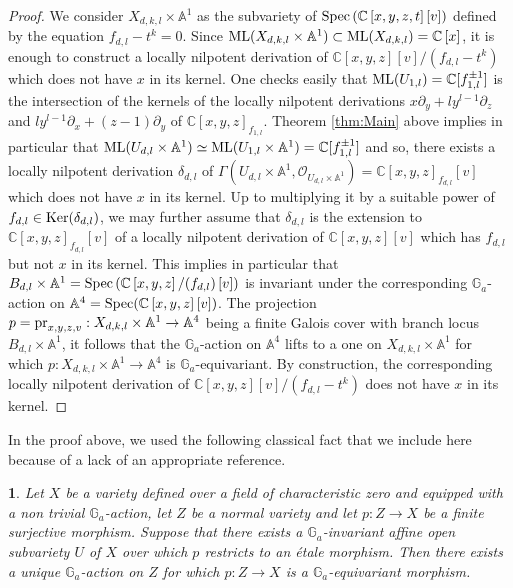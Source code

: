 \documentclass[10pt,oneside,english]{amsart}
\numberwithin{equation}{section}
\numberwithin{figure}{section}
\theoremstyle{plain}
\theoremstyle{remark}
\theoremstyle{plain}
\theoremstyle{plain}
\newtheorem{lem}[thm]{\protect\lemmaname}
\theoremstyle{definition}
\providecommand{\lemmaname}{Lemma}
\begin{document}
\begin{proof}
We consider $X_{d,k,l}\times\mathbb{A}^{1}$ as the subvariety of
${\rm Spec}\left(\mathbb{C}\left[x,y,z,t\right]\left[v\right]\right)$
defined by the equation $f_{d,l}-t^{k}=0$. Since ${\rm ML}(X_{d,k,l}\times\mathbb{A}^{1})\subset{\rm ML}(X_{d,k,l})=\mathbb{C}\left[x\right]$,
it is enough to construct a locally nilpotent derivation of $\mathbb{C}\left[x,y,z\right]\left[v\right]/(f_{d,l}-t^{k})$
which does not have $x$ in its kernel. One checks easily that ${\rm ML}(U_{1,l})=\mathbb{C}[f_{1,l}^{\pm1}]$
is the intersection of the kernels of the locally nilpotent derivations
$x\partial_{y}+ly^{l-1}\partial_{z}$ and $ly^{l-1}\partial_{x}+\left(z-1\right)\partial_{y}$
of $\mathbb{C}\left[x,y,z\right]_{f_{1,l}}$. Theorem \ref{thm:Main}
above implies in particular that ${\rm ML}(U_{d,l}\times\mathbb{A}^{1})\simeq{\rm ML}(U_{1,l}\times\mathbb{A}^{1})=\mathbb{C}[f_{1,l}^{\pm1}]$
and so, there exists a locally nilpotent derivation $\delta_{d,l}$
of $\Gamma(U_{d,l}\times\mathbb{A}^{1},\mathcal{O}_{U_{d,l}\times\mathbb{A}^{1}})=\mathbb{C}\left[x,y,z\right]_{f_{d,l}}\left[v\right]$
which does not have $x$ in its kernel. Up to multiplying it by a
suitable power of $f_{d,l}\in{\rm Ker}(\delta_{d,l})$, we may further
assume that $\delta_{d,l}$ is the extension to $\mathbb{C}\left[x,y,z\right]_{f_{d,l}}\left[v\right]$
of a locally nilpotent derivation of $\mathbb{C}\left[x,y,z\right]\left[v\right]$
which has $f_{d,l}$ but not $x$ in its kernel. This implies in particular
that $B_{d,l}\times\mathbb{A}^{1}={\rm Spec}\left(\mathbb{C}\left[x,y,z\right]/(f_{d,l})\left[v\right]\right)$
is invariant under the corresponding $\mathbb{G}_{a}$-action on $\mathbb{A}^{4}={\rm Spec}(\mathbb{C}\left[x,y,z\right]\left[v\right])$.
The projection $p={\rm pr}_{x,y,z,v}:X_{d,k,l}\times\mathbb{A}^{1}\rightarrow\mathbb{A}^{4}$
being a finite Galois cover with branch locus $B_{d,l}\times\mathbb{A}^{1}$,
it follows that the $\mathbb{G}_{a}$-action on $\mathbb{A}^{4}$
lifts to a one on $X_{d,k,l}\times\mathbb{A}^{1}$ for which $p:X_{d,k,l}\times\mathbb{A}^{1}\rightarrow\mathbb{A}^{4}$
is $\mathbb{G}_{a}$-equivariant. By construction, the corresponding
locally nilpotent derivation of $\mathbb{C}\left[x,y,z\right]\left[v\right]/(f_{d,l}-t^{k})$
does not have $x$ in its kernel. 
\end{proof}
\noindent In the proof above, we used the following classical fact
that we include here because of a lack of an appropriate reference. 
\begin{lem}
\label{lem:LiftingLemma} Let $X$ be a variety defined over a field
of characteristic zero and equipped with a non trivial $\mathbb{G}_{a}$-action,
let $Z$ be a normal variety and let $p:Z\rightarrow X$ be a finite
surjective morphism. Suppose that there exists a $\mathbb{G}_{a}$-invariant
affine open subvariety $U$ of $X$ over which $p$ restricts to an
\'etale morphism. Then there exists a unique $\mathbb{G}_{a}$-action
on $Z$ for which $p:Z\rightarrow X$ is a $\mathbb{G}_{a}$-equivariant
morphism.\end{lem}
\end{document}
